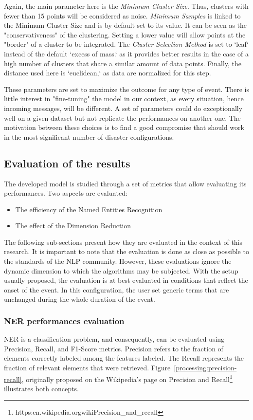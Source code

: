 Again, the main parameter here is the \textit{Minimum Cluster Size}.
Thus, clusters with fewer than 15 points will be considered as noise.
\textit{Minimum Samples} is linked to the Minimum Cluster Size and is by default set to its value.
It can be seen as the "conservativeness" of the clustering.
Setting a lower value will allow points at the "border" of a cluster to be integrated.
The \textit{Cluster Selection Method} is set to `leaf` instead of the default `excess of mass.`
as it provides better results in the case of a high number of clusters that share a similar amount of data points.
Finally, the distance used here is `euclidean,` as data are normalized for this step.

These parameters are set to maximize the outcome for any type of event.
There is little interest in "fine-tuning" the model in our context, as every situation, hence incoming messages, will be different.
A set of parameters could do exceptionally well on a given dataset but not replicate the performances on another one.
The motivation between these choices is to find a good compromise that should work in the most significant number of disaster configurations.

\subsection{Evaluation of the results}
The developed model is studied through a set of metrics that allow evaluating its performances.
Two aspects are evaluated:

\begin{itemize}
    \item The efficiency of the Named Entities Recognition
    \item The effect of the Dimension Reduction
\end{itemize}

The following sub-sections present how they are evaluated in the context of this research.
It is important to note that the evaluation is done as close as possible to the standards of the NLP community.
However, these evaluations ignore the dynamic dimension to which the algorithms may be subjected.
With the setup usually proposed, the evaluation is at best evaluated in conditions that reflect the onset of the event.
In this configuration, the user set generic terms that are unchanged during the whole duration of the event.

\subsubsection{NER performances evaluation}
NER is a classification problem, and consequently, can be evaluated using Precision, Recall, and F1-Score metrics.
Precision refers to the fraction of elements correctly labeled among the features labeled.
The Recall represents the fraction of relevant elements that were retrieved.
Figure~\ref{processing:precision-recall}, originally proposed on the Wikipedia's page on Precision and Recall\footnote{https:\/\/en.wikipedia.org\/wiki\/Precision\_and\_recall} illustrates both concepts.

